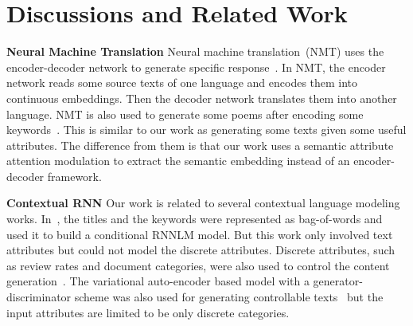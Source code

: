 \documentclass[a4paper]{article}
\begin{document}
\section{Discussions and Related Work}
\textbf{Neural Machine Translation}
Neural machine translation~(NMT) uses the encoder-decoder network to generate specific response~\cite{cho2014learning}. In NMT, the encoder network reads some source texts of one language and encodes them into continuous embeddings. Then the decoder network translates them into another language. NMT is also used to generate some poems after encoding some keywords~\cite{wang2016chinese}. This is similar to our work as generating some texts given some useful attributes. The difference from them is that our work uses a semantic attribute attention modulation to extract the semantic embedding instead of an encoder-decoder framework.

\textbf{Contextual RNN}    Our work is related to several contextual language modeling works.
In~\cite{hoang2016incorporating}, the titles and the keywords were represented as bag-of-words and used it to build a conditional RNNLM model. But this work only involved text attributes but could not model the discrete attributes. Discrete attributes, such as review rates and document categories, were also used to control the content generation~\cite{tang2016context}.
The variational auto-encoder based model with a generator-discriminator scheme was also used for generating controllable texts~\cite{hu2017toward} but the input attributes are limited to be only discrete categories.
\end{document}
